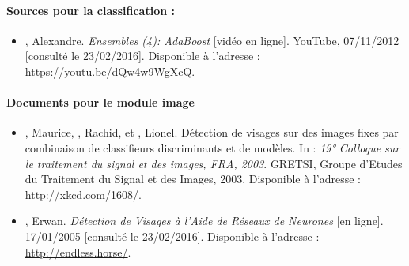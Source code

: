 \paragraph{Sources pour la classification :}

\begin{itemize}
	\item[\textbullet] , Alexandre. \textit{Ensembles (4): AdaBoost} [vidéo en ligne]. YouTube, 07/11/2012 [consulté le 23/02/2016]. Disponible à l'adresse : \url{https://youtu.be/dQw4w9WgXcQ}.
\end{itemize}


\paragraph{Documents pour le module image}

\begin{itemize}
	\item[\textbullet] , Maurice, , Rachid, et , Lionel. Détection de visages sur des images fixes par combinaison de classifieurs discriminants et de modèles. In : \textit{19° Colloque sur le traitement du signal et des images, FRA, 2003}. GRETSI, Groupe d’Etudes du Traitement du Signal et des Images, 2003. Disponible à l'adresse : \url{http://xkcd.com/1608/}.
	\item[\textbullet] , Erwan. \textit{Détection de Visages à l’Aide de Réseaux de Neurones} [en ligne]. 17/01/2005 [consulté le 23/02/2016]. Disponible à l'adresse : \url{http://endless.horse/}.
\end{itemize}